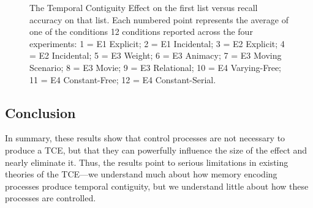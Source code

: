 \documentclass[man,natbib,floatsintext]{apa6} %
\begin{document}
\begin{figure}
\caption{The Temporal Contiguity Effect on the first list versus recall accuracy on that list. Each numbered point represents the average of one of the conditions 12 conditions reported across the four experiments: 1 = E1 Explicit; 2 = E1 Incidental; 3 = E2 Explicit; 4 = E2 Incidental; 5 = E3 Weight; 6 = E3 Animacy; 7 = E3 Moving Scenario; 8 = E3 Movie; 9 = E3 Relational; 10 = E4 Varying-Free; 11 = E4 Constant-Free; 12 = E4 Constant-Serial.}
\label{corr}
\end{figure}

\subsection{Conclusion}
In summary, these results show that control processes are not necessary to produce a TCE, but that they can powerfully influence the size of the effect and nearly eliminate it. Thus, the results point to serious limitations in existing theories of the TCE---we understand much about how memory encoding processes produce temporal contiguity, but we understand little about how these processes are controlled.


\end{document}
